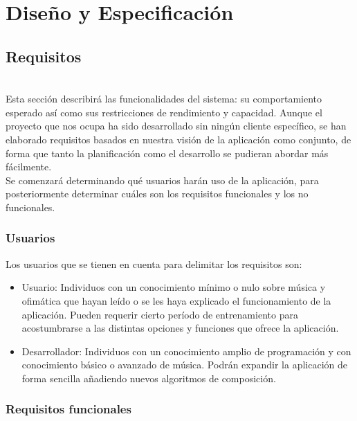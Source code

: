 \chapter{Diseño y Especificación}
\label{chap:diseno}


\section{Requisitos}
\\
	Esta sección describirá las funcionalidades del sistema: su comportamiento esperado así como sus restricciones de rendimiento y capacidad. Aunque el proyecto que nos ocupa ha sido desarrollado sin ningún cliente específico, se han elaborado requisitos basados en nuestra visión de la aplicación como conjunto, de forma que tanto la planificación como el desarrollo se pudieran abordar más fácilmente.\\
	
	Se comenzará determinando qué usuarios harán uso de la aplicación, para posteriormente determinar cuáles son los requisitos funcionales y los no funcionales.
	
	\subsection{Usuarios}
	
	Los usuarios que se tienen en cuenta para delimitar los requisitos son:
	
	\begin{itemize}
		\item Usuario: Individuos con un conocimiento mínimo o nulo sobre música y ofimática que hayan leído o se les haya explicado el funcionamiento de la aplicación. Pueden requerir cierto período de entrenamiento para acostumbrarse a las distintas opciones y funciones que ofrece la aplicación.
		\item Desarrollador: Individuos con un conocimiento amplio de programación y con conocimiento básico o avanzado de música. Podrán expandir la aplicación de forma sencilla añadiendo nuevos algoritmos de composición.
		
	\end{itemize}

	\subsection{Requisitos funcionales}
	
